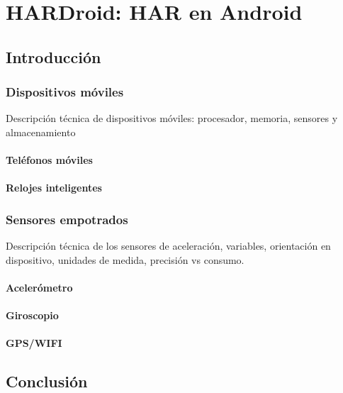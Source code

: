 
\chapter{HARDroid: HAR en Android}

\label{chap5:hardroid}

\section{Introducción}

\subsection{Dispositivos móviles}

\label{ssec46:dispositivos-moviles}Descripción técnica de dispositivos
móviles: procesador, memoria, sensores y almacenamiento

\subsubsection{Teléfonos móviles}

\subsubsection{Relojes inteligentes}

\subsection{Sensores empotrados}

\label{ssec46:sensores-empotrados}Descripción técnica de los sensores
de aceleración, variables, orientación en dispositivo, unidades de
medida, precisión vs consumo.

\subsubsection{Acelerómetro}

\subsubsection{Giroscopio}

\subsubsection{GPS/WIFI}

\section{Conclusión}
